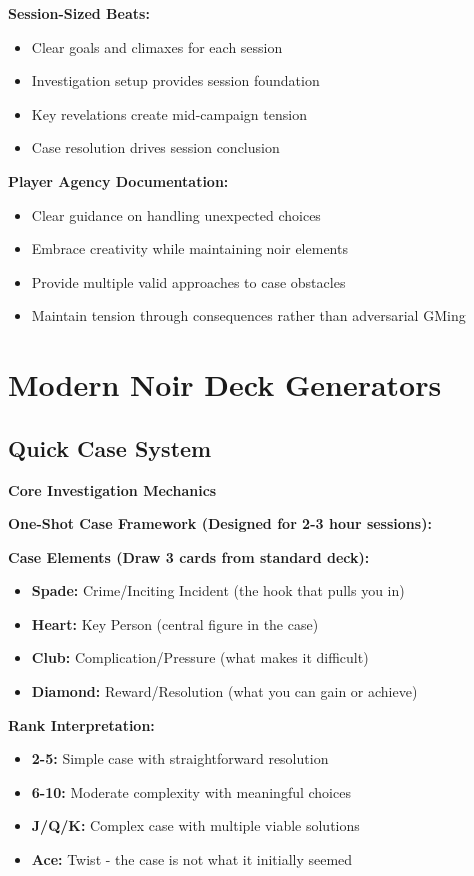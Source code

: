 \documentclass[11pt]{article}
\begin{document}
\textbf{Session-Sized Beats:}
\begin{itemize}
\item Clear goals and climaxes for each session
\item Investigation setup provides session foundation
\item Key revelations create mid-campaign tension
\item Case resolution drives session conclusion
\end{itemize}

\textbf{Player Agency Documentation:}
\begin{itemize}
\item Clear guidance on handling unexpected choices
\item Embrace creativity while maintaining noir elements
\item Provide multiple valid approaches to case obstacles
\item Maintain tension through consequences rather than adversarial GMing
\end{itemize}

\section{Modern Noir Deck Generators}

\subsection{Quick Case System}

\textbf{Core Investigation Mechanics}

\textbf{One-Shot Case Framework (Designed for 2-3 hour sessions):}

\textbf{Case Elements (Draw 3 cards from standard deck):}
\begin{itemize}
    \item \textbf{Spade:} Crime/Inciting Incident (the hook that pulls you in)
    \item \textbf{Heart:} Key Person (central figure in the case)
    \item \textbf{Club:} Complication/Pressure (what makes it difficult)
    \item \textbf{Diamond:} Reward/Resolution (what you can gain or achieve)
\end{itemize}

\textbf{Rank Interpretation:}
\begin{itemize}
    \item \textbf{2-5:} Simple case with straightforward resolution
    \item \textbf{6-10:} Moderate complexity with meaningful choices
    \item \textbf{J/Q/K:} Complex case with multiple viable solutions
    \item \textbf{Ace:} Twist - the case is not what it initially seemed
\end{itemize}
\end{document}
